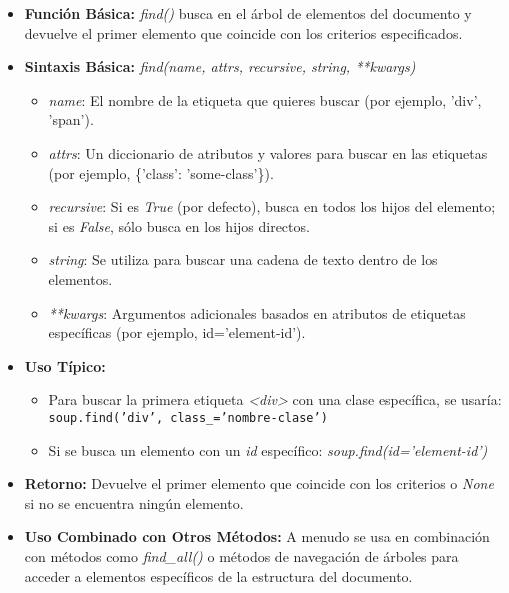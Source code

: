     \begin{itemize}
        \item \textbf{Función Básica:} 
            \textit{find()} busca en el árbol de elementos del documento y devuelve el primer elemento que coincide con los criterios especificados.
          
        \item \textbf{Sintaxis Básica:} 
            \textit{find(name, attrs, recursive, string, **kwargs)}
            \begin{itemize}
                \item \textit{name}: El nombre de la etiqueta que quieres buscar (por ejemplo, 'div', 'span').
                \item \textit{attrs}: Un diccionario de atributos y valores para buscar en las etiquetas (por ejemplo, \{'class': 'some-class'\}).
                \item \textit{recursive}: Si es \textit{True} (por defecto), busca en todos los hijos del elemento; si es \textit{False}, sólo busca en los hijos directos.
                \item \textit{string}: Se utiliza para buscar una cadena de texto dentro de los elementos.
                \item \textit{**kwargs}: Argumentos adicionales basados en atributos de etiquetas específicas (por ejemplo, id='element-id').
            \end{itemize}
      
        \item \textbf{Uso Típico:}
            \begin{itemize}
                \item Para buscar la primera etiqueta \textit{<div>} con una clase específica, se usaría: \texttt{soup.find('div', class\_='nombre-clase')}
                \item Si se busca un elemento con un \textit{id} específico: \textit{soup.find(id='element-id')}
            \end{itemize}
      
        \item \textbf{Retorno:} 
            Devuelve el primer elemento que coincide con los criterios o \textit{None} si no se encuentra ningún elemento.
      
        \item \textbf{Uso Combinado con Otros Métodos:} 
            A menudo se usa en combinación con métodos como \textit{find\_all()} o métodos de navegación de árboles para acceder a elementos específicos de la estructura del documento.
    \end{itemize}
      
